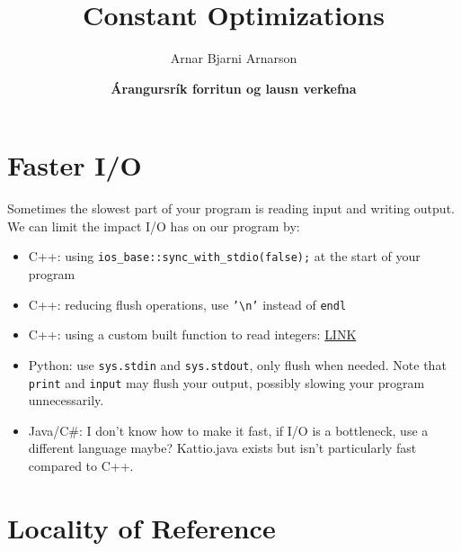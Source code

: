\documentclass{beamer}
\title{Constant Optimizations}
\author{Arnar Bjarni Arnarson}
\institute{\href{http://ru.is/td}{School of Computer Science} \\[2pt] \href{http://ru.is}{Reykjavík University}}
\date{\textbf{Árangursrík forritun og lausn verkefna}}
\begin{document}
\begin{frame}[plain]
    \titlepage
\end{frame}

\section*{Faster I/O}

\begin{frame}
    Sometimes the slowest part of your program is reading input and writing output.
    We can limit the impact I/O has on our program by:
    \begin{itemize}
        \item<2-> C++: using \texttt{ios\_base::sync\_with\_stdio(false);} at the start of your program
        \item<3-> C++: reducing flush operations, use \texttt{'\textbackslash n'} instead of \texttt{endl}
        \item<4-> C++: using a custom built function to read integers: \href{https://github.com/SuprDewd/CompetitiveProgramming/blob/master/code/tricks/fast_input.cpp}{LINK}
        \item<5-> Python: use \texttt{sys.stdin} and \texttt{sys.stdout}, only flush when needed. Note that \texttt{print} and \texttt{input} may flush your output, possibly slowing your program unnecessarily.
        \item<6-> Java/C\#: I don't know how to make it fast, if I/O is a bottleneck, use a different language maybe? Kattio.java exists but isn't particularly fast compared to C++.
    \end{itemize}
\end{frame}

\section*{Locality of Reference}
\end{document}
